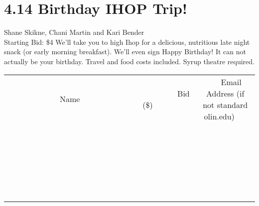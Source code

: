 \documentclass[11pt]{article}
\begin{document}
\section*{4.14 Birthday IHOP Trip!}
Shane Skikne, Chani  Martin and Kari Bender
\\
Starting Bid: \$4
\newline
We'll take you to high Ihop for a delicious, nutritious late night snack (or early morning breakfast). We'll even sign Happy Birthday! It can not actually be your birthday. Travel and food costs included. Syrup theatre required.
\\[6ex]
\begin{tabular}{c c c}
~~~~~~~~~~~~~Name~~~~~~~~~~~~~ & ~~~~~~~~~Bid (\$)~~~~~~~~~  & ~~~Email Address (if not standard olin.edu)~~~\\
 & & \\
\hline
 & & \\
\hline
 & & \\
\hline
 & & \\
\hline
 & & \\
\hline
 & & \\
\hline
 & & \\
\hline
 & & \\
\hline
 & & \\
\hline
 & & \\
\hline
 & & \\
\hline
 & & \\
\hline
 & & \\
\hline
 & & \\
\hline
 & & \\
\hline
 & & \\
\hline
 & & \\
\hline
 & & \\
\hline
 & & \\
\hline
 & & \\
\hline
 & & \\
\hline
 & & \\
\hline
 & & \\
\hline
 & & \\
\hline
 & & \\
\hline
 & & \\
\hline
\end{tabular}
\newpage
\end{document}
